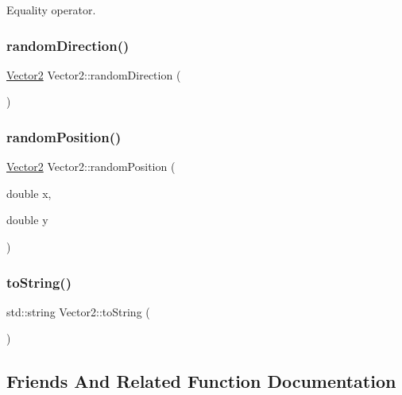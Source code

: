 Equality operator. 

\mbox{\label{struct_vector2_a4ae4f36c515bda9939cfe36e58b25f45}} 
\subsubsection{\texorpdfstring{random\+Direction()}{randomDirection()}}
{\footnotesize\ttfamily \mbox{\hyperlink{struct_vector2}{Vector2}} Vector2\+::random\+Direction (\begin{DoxyParamCaption}{ }\end{DoxyParamCaption})\hspace{0.3cm}{\ttfamily [static]}}

\mbox{\label{struct_vector2_a13b12c4d8b92bbc3de6fca42cb7a2749}} 
\subsubsection{\texorpdfstring{random\+Position()}{randomPosition()}}
{\footnotesize\ttfamily \mbox{\hyperlink{struct_vector2}{Vector2}} Vector2\+::random\+Position (\begin{DoxyParamCaption}\item[{double}]{x,  }\item[{double}]{y }\end{DoxyParamCaption})\hspace{0.3cm}{\ttfamily [static]}}

\mbox{\label{struct_vector2_abcf7d729573613553822f965c3b9a3d2}} 
\subsubsection{\texorpdfstring{to\+String()}{toString()}}
{\footnotesize\ttfamily std\+::string Vector2\+::to\+String (\begin{DoxyParamCaption}{ }\end{DoxyParamCaption})}



\subsection{Friends And Related Function Documentation}
\mbox{\label{struct_vector2_a489f5283f5f1dc905c57d0a40d98c1af}} 
